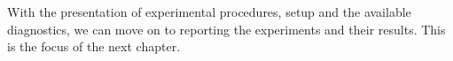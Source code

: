 With the presentation of experimental procedures, setup and the available diagnostics, we can move on to reporting the experiments and their results. This is the focus of the next chapter.
